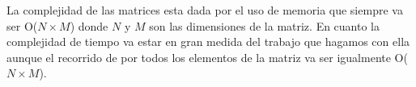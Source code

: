 La complejidad de las matrices esta dada por el uso de memoria que siempre va ser O($N \times M$) donde $N$ y $M$ son las dimensiones de la matriz. En cuanto la complejidad de tiempo va estar en gran medida del trabajo que hagamos con ella aunque el recorrido de por todos los elementos de la matriz va ser igualmente O($N \times M$).